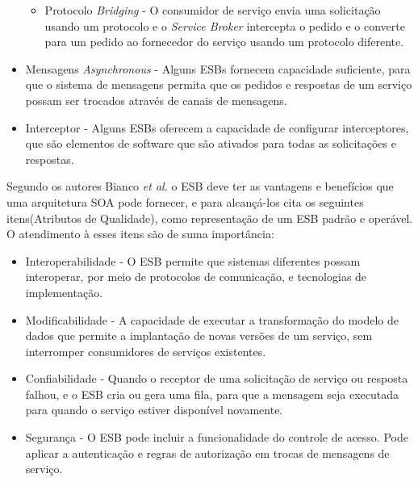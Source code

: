 \begin{itemize}
\begin{itemize}
\item Protocolo \textit{Bridging} - O consumidor de serviço envia uma solicitação usando um protocolo e o \textit{Service Broker} intercepta o pedido e o converte para um pedido ao fornecedor do serviço usando um protocolo diferente.

\end{itemize}

\item Mensagens \textit{Asynchronous} - Alguns \acrshort{ESB}s fornecem capacidade suficiente, para que o sistema de mensagens permita que os pedidos e respostas de um serviço possam ser trocados através de canais de mensagens.

\item Interceptor - Alguns \acrshort{ESB}s oferecem a capacidade de configurar interceptores, que são elementos de software que são ativados para todas as solicitações e respostas.

\end{itemize}

Segundo os autores Bianco \textit{et al.} \cite{bianco2011architecting} o \acrshort{ESB} deve ter as vantagens e benefícios que uma arquitetura \acrshort{SOA} pode fornecer,  e para alcançá-los cita os seguintes itens(Atributos de Qualidade), como representação de um \acrshort{ESB} padrão e operável. O atendimento à esses itens são de suma importância:

\begin{itemize}

\item Interoperabilidade - O \acrshort{ESB} permite que sistemas diferentes possam interoperar, por meio de protocolos de comunicação, e tecnologias de implementação. 

\item Modificabilidade - A capacidade de executar a transformação do modelo de dados que permite a implantação de novas versões de um serviço, sem interromper consumidores de serviços existentes. 

\item Confiabilidade - Quando o receptor de uma solicitação de serviço ou resposta falhou, e o ESB cria ou gera uma fila, para que a mensagem seja executada para quando o serviço estiver disponível novamente. 

\item Segurança - O \acrshort{ESB} pode incluir a funcionalidade do controle de acesso. Pode aplicar a autenticação e regras de autorização em trocas de mensagens de serviço.

\end{itemize}


